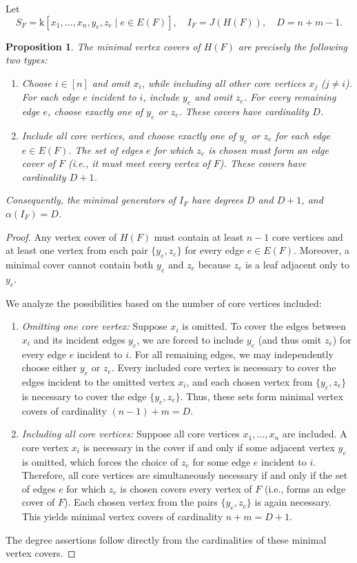 \documentclass[12pt]{amsart}
\newtheorem{proposition}[theorem]{Proposition}
\theoremstyle{definition}
\theoremstyle{remark}
\begin{document}
Let
\[
S_F = \mathrm{k}[x_1, \ldots, x_n, y_e, z_e \mid e \in E(F)],
\quad I_F = J(H(F)), \quad D = n + m - 1.
\]

\begin{proposition}\label{prop:covers}
The minimal vertex covers of $H(F)$ are precisely the following two types:
\begin{enumerate}
\item Choose $i \in [n]$ and omit $x_i$, while including all other core vertices $x_j$ ($j \neq i$). For each edge $e$ incident to $i$, include $y_e$ and omit $z_e$. For every remaining edge $e$, choose exactly one of $y_e$ or $z_e$. These covers have cardinality $D$.
\item Include all core vertices, and choose exactly one of $y_e$ or $z_e$ for each edge $e \in E(F)$. The set of edges $e$ for which $z_e$ is chosen must form an edge cover of $F$ (i.e., it must meet every vertex of $F$). These covers have cardinality $D + 1$.
\end{enumerate}
Consequently, the minimal generators of $I_F$ have degrees $D$ and $D + 1$, and $\alpha(I_F) = D$.
\end{proposition}

\begin{proof}
Any vertex cover of $H(F)$ must contain at least $n - 1$ core vertices and at least one vertex from each pair $\{y_e, z_e\}$ for every edge $e \in E(F)$. Moreover, a minimal cover cannot contain both $y_e$ and $z_e$ because $z_e$ is a leaf adjacent only to $y_e$.

We analyze the possibilities based on the number of core vertices included:
\begin{enumerate}
\item[(i)] \emph{Omitting one core vertex:} Suppose $x_i$ is omitted. To cover the edges between $x_i$ and its incident edges $y_e$, we are forced to include $y_e$ (and thus omit $z_e$) for every edge $e$ incident to $i$. For all remaining edges, we may independently choose either $y_e$ or $z_e$. Every included core vertex is necessary to cover the edges incident to the omitted vertex $x_i$, and each chosen vertex from $\{y_e, z_e\}$ is necessary to cover the edge $\{y_e, z_e\}$. Thus, these sets form minimal vertex covers of cardinality $(n - 1) + m = D$.

\item[(ii)] \emph{Including all core vertices:} Suppose all core vertices $x_1, \ldots, x_n$ are included. A core vertex $x_i$ is necessary in the cover if and only if some adjacent vertex $y_e$ is omitted, which forces the choice of $z_e$ for some edge $e$ incident to $i$. Therefore, all core vertices are simultaneously necessary if and only if the set of edges $e$ for which $z_e$ is chosen covers every vertex of $F$ (i.e., forms an edge cover of $F$). Each chosen vertex from the pairs $\{y_e, z_e\}$ is again necessary. This yields minimal vertex covers of cardinality $n + m = D + 1$.
\end{enumerate}

The degree assertions follow directly from the cardinalities of these minimal vertex covers.
\end{proof}
\end{document}
